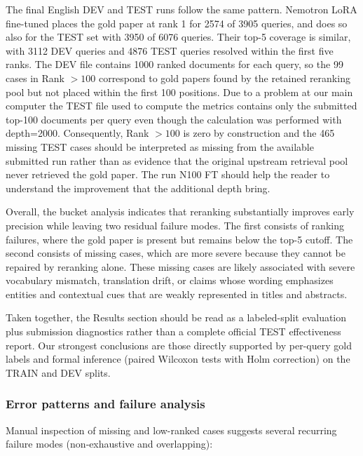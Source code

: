 The final English DEV and TEST runs follow the same pattern. Nemotron LoRA fine-tuned places the gold paper at rank 1 for 2574 of 3905 queries, and does so also for the TEST set with 3950 of 6076 queries. Their top-5 coverage is similar, with 3112 DEV queries and 4876 TEST queries resolved within the first five ranks. The DEV file contains 1000 ranked documents for each query, so the 99 cases in Rank $>100$ correspond to gold papers found by the retained reranking pool but not placed within the first 100 positions. Due to a problem at our main computer the TEST file used to compute the metrics contains only the submitted top-100 documents per query even though the calculation was performed with depth=2000. Consequently, Rank $>100$ is zero by construction and the 465 missing TEST cases should be interpreted as missing from the available submitted run rather than as evidence that the original upstream retrieval pool never retrieved the gold paper. The run N100 FT should help the reader to understand the improvement that the additional depth bring.


Overall, the bucket analysis indicates that reranking substantially improves early precision while leaving two residual failure modes. The first consists of ranking failures, where the gold paper is present but remains below the top-5 cutoff. The second consists of missing cases, which are more severe because they cannot be repaired by reranking alone. These missing cases are likely associated with severe vocabulary mismatch, translation drift, or claims whose wording emphasizes entities and contextual cues that are weakly represented in titles and abstracts.

Taken together, the Results section should be read as a labeled-split evaluation plus submission diagnostics rather than a complete official TEST effectiveness report. Our strongest conclusions are those directly supported by per-query gold labels and formal inference (paired Wilcoxon tests with Holm correction) on the TRAIN and DEV splits. 


\subsubsection{Error patterns and failure analysis}

Manual inspection of missing and low-ranked cases suggests several recurring failure modes (non‑exhaustive and overlapping):

